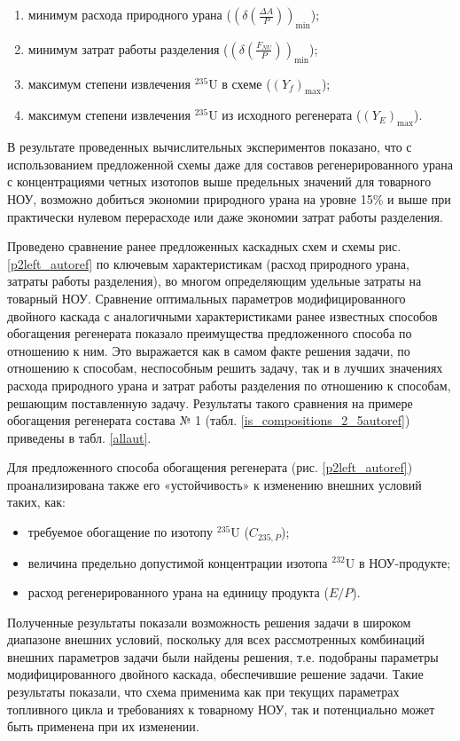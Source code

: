 \begin{enumerate}
  \item минимум расхода природного урана ($(\delta(\frac{\Delta A}{P}))_\text{min}$);
  \item минимум затрат работы разделения ($(\delta(\frac{F_{NU}}{P}))_\text{min}$);
  \item максимум степени извлечения $^{235}$U в схеме ($(Y_f)_\text{max}$);
  \item максимум степени извлечения $^{235}$U из исходного регенерата ($(Y_{E})_\text{max}$).
\end{enumerate}  

В результате проведенных вычислительных экспериментов показано, что с использованием предложенной схемы даже для составов регенерированного урана с концентрациями четных изотопов выше предельных значений для товарного НОУ, возможно добиться экономии природного урана на уровне 15\% и выше при практически нулевом перерасходе или даже экономии затрат работы разделения. 

Проведено сравнение ранее предложенных каскадных схем и схемы рис. \ref{p2left_autoref} по ключевым характеристикам (расход природного урана, затраты работы разделения), во многом определяющим удельные затраты на товарный НОУ. Сравнение оптимальных параметров модифицированного двойного каскада с аналогичными характеристиками ранее известных способов обогащения регенерата показало преимущества предложенного способа по отношению к ним. Это выражается как в самом факте решения задачи, по отношению к способам, неспособным решить задачу, так и в лучших значениях расхода природного урана и затрат работы разделения по отношению к способам, решающим поставленную задачу. Результаты такого сравнения на примере обогащения регенерата состава № 1 (табл. \ref{is_compositions_2_5autoref}) приведены в табл. \ref{allaut}. 

Для предложенного способа обогащения регенерата (рис. \ref{p2left_autoref}) проанализирована также его «устойчивость» к изменению внешних условий таких, как:
\begin{itemize}
  \item требуемое обогащение по изотопу $^{235}$U ($C_{235,P}$);    
  \item величина предельно допустимой концентрации изотопа $^{232}$U в НОУ-продукте;
  \item расход регенерированного урана на единицу продукта ($E/P$).
\end{itemize}

Полученные результаты показали возможность решения задачи в широком диапазоне внешних условий, поскольку для всех рассмотренных комбинаций внешних параметров задачи были найдены решения, т.е. подобраны параметры модифицированного двойного каскада, обеспечившие решение задачи. Такие результаты показали, что схема применима как при текущих параметрах топливного цикла и требованиях к товарному НОУ, так и потенциально может быть применена при их изменении.


